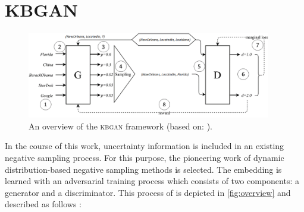 \section{KBGAN} 
\label{sec:kbgan}
%
\begin{figure}[H]
  \centering
    \includegraphics[width=0.95\textwidth]{figures/kbgan_original.png}
  \caption{An overview of the \textsc{kbgan} framework (based on: \cite{cai2017kbgan}).}
  \label{fig:overview}
\end{figure}
In the course of this work, uncertainty information is included in an existing negative sampling process.
For this purpose, the pioneering work of dynamic distribution-based negative sampling methods \kbgan is selected.
The embedding is learned with an adversarial training process which consists of two components: a generator and a discriminator.
This process of \kbgan is depicted in \autoref{fig:overview} and described as follows \cite{cai2017kbgan}:
